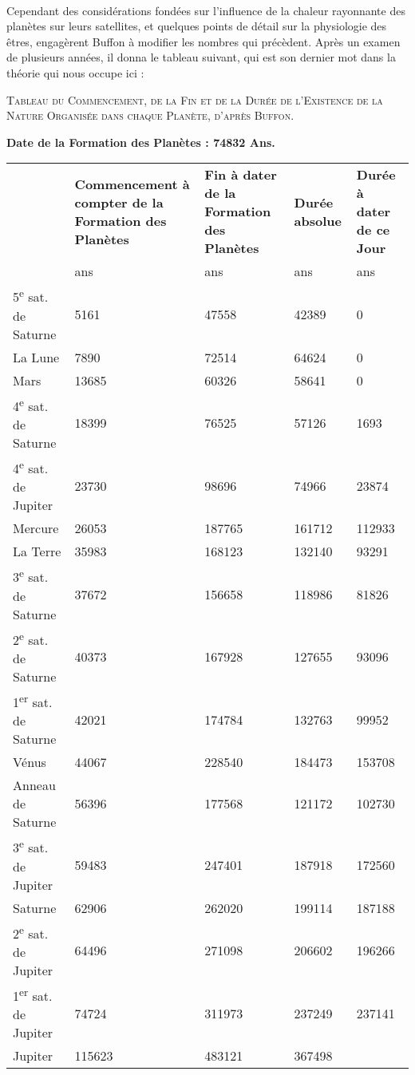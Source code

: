 \documentclass[a4paper, 11pt, oneside]{article}
\begin{document}
\paragraph{}
Cependant des considérations fondées sur l'influence de la chaleur rayonnante des planètes sur leurs satellites, et quelques points de détail sur la physiologie des êtres, engagèrent Buffon à modifier les nombres qui précèdent. Après un examen de plusieurs années, il donna le tableau suivant, qui est son dernier mot dans la théorie qui nous occupe ici :
\begin{center}
\scshape
\small
Tableau du Commencement, de la Fin et de la Durée de l'Existence de la Nature Organisée dans chaque Planète, d'après Buffon.
\end{center}
\begin{center}
\textbf{Date de la Formation des Planètes : 74832 Ans.}
\end{center}
\begin{center}
    \centering
    \footnotesize
    \begin{longtable}{l p{25mm} p{15mm} p{15mm} p{20mm}}
        ~ & \textbf{Commencement à compter de la Formation des Planètes} & \textbf{Fin à dater de la Formation des Planètes} & \textbf{Durée absolue} & \textbf{Durée à dater de ce Jour} \\
        ~ & ans & ans & ans & ans \\
        5\textsuperscript{e} sat. de Saturne & 5161 & 47558 & 42389 & 0 \\
        La Lune & 7890 & 72514 & 64624 & 0 \\
        Mars & 13685 & 60326 & 58641 & 0 \\
        4\textsuperscript{e} sat. de Saturne & 18399 & 76525 & 57126 & 1693 \\
        4\textsuperscript{e} sat. de Jupiter & 23730 & 98696 & 74966 & 23874 \\
        Mercure & 26053 & 187765 & 161712 & 112933 \\
        La Terre & 35983 & 168123 & 132140 & 93291 \\
        3\textsuperscript{e} sat. de Saturne & 37672 & 156658 & 118986 & 81826 \\
        2\textsuperscript{e} sat. de Saturne & 40373 & 167928 & 127655 & 93096 \\
        1\textsuperscript{er} sat. de Saturne & 42021 & 174784 & 132763 & 99952 \\
        Vénus & 44067 & 228540 & 184473 & 153708 \\
        Anneau de Saturne & 56396 & 177568 & 121172 & 102730 \\
        3\textsuperscript{e} sat. de Jupiter & 59483 & 247401 & 187918 & 172560 \\
        Saturne & 62906 & 262020 & 199114 & 187188 \\
        2\textsuperscript{e} sat. de Jupiter & 64496 & 271098 & 206602 & 196266 \\
        1\textsuperscript{er} sat. de Jupiter & 74724 & 311973 & 237249 & 237141 \\
        Jupiter & 115623 & 483121 & 367498 & ~ \\
    \end{longtable}
\end{center}
\end{document}
